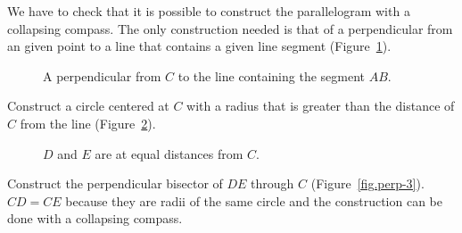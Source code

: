 \documentclass[11pt,a4paper]{article}
\begin{document}
We have to check that it is possible to construct the parallelogram with a collapsing compass. The only construction needed is that of a perpendicular from an given point to a line that contains a given line segment (Figure~\ref{fig.perp-1}).
\begin{figure}[H]
\begin{center}
\caption{A perpendicular from $C$ to the line containing the segment $AB$.}\label{fig.perp-1}
\end{center}
\end{figure}
\vspace*{-4ex}
Construct a circle centered at $C$ with a radius that is greater than the distance of $C$ from the line (Figure~\ref{fig.perp-2}).
\begin{figure}[H]
\begin{center}
\caption{$D$ and $E$ are at equal distances from $C$.}\label{fig.perp-2}
\end{center}
\end{figure}
\vspace*{-4ex}
Construct the perpendicular bisector of $DE$ through $C$ (Figure~\ref{fig.perp-3}). $CD = CE$ because they are radii of the same circle and the construction can be done with a collapsing compass.
\end{document}
